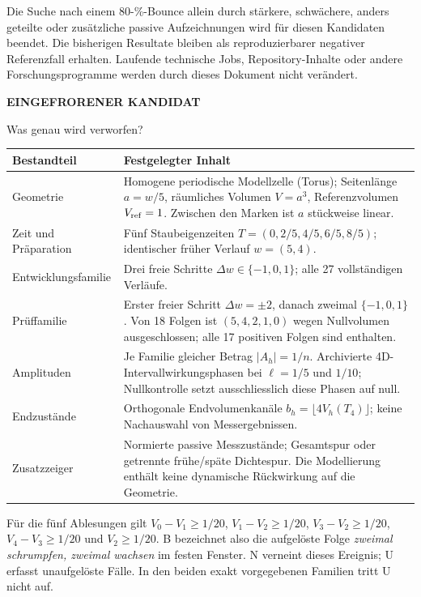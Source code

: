 \documentclass[11pt,a4paper]{article}
\newcommand{\kicker}[1]{{\sffamily\bfseries\small\color{teal}#1}\par}
\newcommand{\tit}[1]{{\sffamily\bfseries\LARGE\raggedright #1\par}\vspace{3pt}}
\newcommand{\sect}[1]{\par\vspace{3pt}{\sffamily\bfseries\large #1}\par}
\begin{document}
\sect{Beendete Untersuchungsrichtung}
Die Suche nach einem 80-\%-Bounce allein durch stärkere, schwächere, anders geteilte oder zusätzliche passive Aufzeichnungen wird für diesen Kandidaten beendet. Die bisherigen Resultate bleiben als reproduzierbarer negativer Referenzfall erhalten. Laufende technische Jobs, Repository-Inhalte oder andere Forschungsprogramme werden durch dieses Dokument nicht verändert.

\newpage
\kicker{EINGEFRORENER KANDIDAT}
\tit{Was genau wird verworfen?}
\par\begin{tabularx}{\linewidth}{@{}p{37mm}Y@{}}\toprule
\textbf{Bestandteil} & \textbf{Festgelegter Inhalt}\\\midrule
Geometrie & Homogene periodische Modellzelle (Torus); Seitenlänge $a=w/5$, räumliches Volumen $V=a^3$, Referenzvolumen $V_{\rm ref}=1$. Zwischen den Marken ist $a$ stückweise linear.\\
Zeit und Präparation & Fünf Staubeigenzeiten $T=(0,2/5,4/5,6/5,8/5)$; identischer früher Verlauf $w=(5,4)$.\\
Entwicklungsfamilie & Drei freie Schritte $\Delta w\in\{-1,0,1\}$; alle 27 vollständigen Verläufe.\\
Prüffamilie & Erster freier Schritt $\Delta w=\pm2$, danach zweimal $\{-1,0,1\}$. Von 18 Folgen ist $(5,4,2,1,0)$ wegen Nullvolumen ausgeschlossen; alle 17 positiven Folgen sind enthalten.\\
Amplituden & Je Familie gleicher Betrag $|A_h|=1/n$. Archivierte 4D-Intervallwirkungsphasen bei $\ell=1/5$ und $1/10$; Nullkontrolle setzt ausschliesslich diese Phasen auf null.\\
Endzustände & Orthogonale Endvolumenkanäle $b_h=\lfloor4V_h(T_4)\rfloor$; keine Nachauswahl von Messergebnissen.\\
Zusatzzeiger & Normierte passive Messzustände; Gesamtspur oder getrennte frühe/späte Dichtespur. Die Modellierung enthält keine dynamische Rückwirkung auf die Geometrie.\\\bottomrule
\end{tabularx}\par\vspace{3pt}

\sect{Das Ereignis B ist eine präzise, begrenzte Frage}
Für die fünf Ablesungen gilt $V_0-V_1\ge1/20$, $V_1-V_2\ge1/20$, $V_3-V_2\ge1/20$, $V_4-V_3\ge1/20$ und $V_2\ge1/20$. B bezeichnet also die aufgelöste Folge \emph{zweimal schrumpfen, zweimal wachsen} im festen Fenster. N verneint dieses Ereignis; U erfasst unaufgelöste Fälle. In den beiden exakt vorgegebenen Familien tritt U nicht auf.
\end{document}
